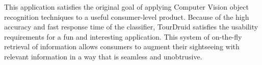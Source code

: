This application satisfies the original goal of applying Computer Vision object recognition techniques to a useful consumer-level product. Because of the high accuracy and fast response time of the classifier, TourDruid satisfies the usability requirements for a fun and interesting application. This system of on-the-fly retrieval of information allows consumers to augment their sightseeing with relevant information in a way that is seamless and unobtrusive. 